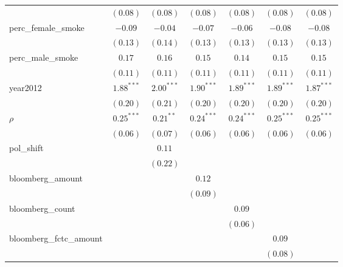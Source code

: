 \begin{table}[!h]
\begin{center}
\begin{tabular}{l c c c c c c }
                        & $(0.08)$     & $(0.08)$     & $(0.08)$     & $(0.08)$     & $(0.08)$     & $(0.08)$     \\
perc\_female\_smoke     & $-0.09$      & $-0.04$      & $-0.07$      & $-0.06$      & $-0.08$      & $-0.08$      \\
                        & $(0.13)$     & $(0.14)$     & $(0.13)$     & $(0.13)$     & $(0.13)$     & $(0.13)$     \\
perc\_male\_smoke       & $0.17$       & $0.16$       & $0.15$       & $0.14$       & $0.15$       & $0.15$       \\
                        & $(0.11)$     & $(0.11)$     & $(0.11)$     & $(0.11)$     & $(0.11)$     & $(0.11)$     \\
year2012                & $1.88^{***}$ & $2.00^{***}$ & $1.90^{***}$ & $1.89^{***}$ & $1.89^{***}$ & $1.87^{***}$ \\
                        & $(0.20)$     & $(0.21)$     & $(0.20)$     & $(0.20)$     & $(0.20)$     & $(0.20)$     \\
$\rho$                  & $0.25^{***}$ & $0.21^{**}$  & $0.24^{***}$ & $0.24^{***}$ & $0.25^{***}$ & $0.25^{***}$ \\
                        & $(0.06)$     & $(0.07)$     & $(0.06)$     & $(0.06)$     & $(0.06)$     & $(0.06)$     \\
pol\_shift              &              & $0.11$       &              &              &              &              \\
                        &              & $(0.22)$     &              &              &              &              \\
bloomberg\_amount       &              &              & $0.12$       &              &              &              \\
                        &              &              & $(0.09)$     &              &              &              \\
bloomberg\_count        &              &              &              & $0.09$       &              &              \\
                        &              &              &              & $(0.06)$     &              &              \\
bloomberg\_fctc\_amount &              &              &              &              & $0.09$       &              \\
                        &              &              &              &              & $(0.08)$     &              \\

\end{tabular}
\end{center}
\end{table}
